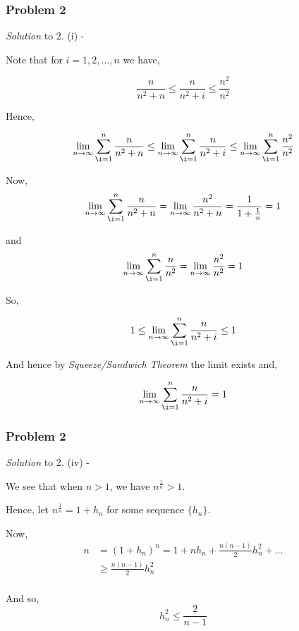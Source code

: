 \documentclass[
	11pt, %
]{beamer}
\begin{document}
\begin{frame}[t]
	\frametitle{Problem 2}

	\textit{Solution} to 2. (i) -

	\bigskip
	
	Note that for $i = 1, 2, \dots ,n$ we have,

	\[ \frac{n}{n^2 + n} \leq \frac{n}{n^2+i} \leq \frac{n^2}{n^2} \]

	Hence,

	\[ \lim_{n \to \infty} \sum _{\i=1} ^n \frac{n}{n^2 + n} \leq  \lim_{n \to \infty} \sum _{\i=1} ^n \frac{n}{n^2+i} \leq \lim_{n \to \infty} \sum _{\i=1} ^n \frac{n^2}{n^2} 	\]

	Now, \[ \lim_{n \to \infty} \sum _{\i=1} ^n \frac{n}{n^2 + n} = \lim_{n \to \infty} \frac{n^2}{n^2 + n} = \frac{1}{1 + \frac{1}{n}} = 1 \] 
\end{frame}

\begin{frame}[t]
	and
	\[ \lim_{n \to \infty} \sum _{\i=1} ^n \frac{n}{n^2} = \lim_{n \to \infty} \frac{n^2}{n^2} = 1 \]

	So,

	\[ 1 \leq  \lim_{n \to \infty} \sum _{\i=1} ^n \frac{n}{n^2+i} \leq 1 \]

	\medskip

	And hence by \textit{Squeeze/Sandwich Theorem} the limit exists and,

	\[ \lim_{n \to \infty} \sum _{\i=1} ^n \frac{n}{n^2+i} = 1 \]

\end{frame}

\begin{frame}[t]
	\frametitle{Problem 2}

	\textit{Solution} to 2. (iv) -

	\bigskip
	
	We see that when $n > 1$, we have $n^\frac{1}{n} > 1$.

	\smallskip

	Hence, let $n^\frac{1}{n} = 1 + h_n$ for some sequence $\{h_n\}$.

	\medskip

	Now,
	\begin{align*}
	n &= (1 + h_n)^n = 1 + nh_n + \frac{n(n-1)}{2} h_n^2 + \dots \\
	& \geq \frac{n(n-1)}{2} h_n^2\\
	\end{align*}

	And so,
	\[h_n^2 \leq \frac{2}{n-1}\]

\end{frame}
\end{document}
